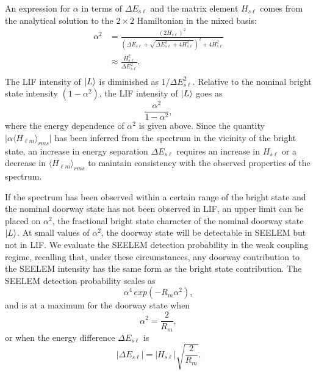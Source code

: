 An expression for $\alpha$ in terms of $\Delta E_{s\ell}$ and the matrix
element $H_{s\ell}$ comes from the analytical solution to the $2 \times
2$ Hamiltonian in the mixed basis:
\begin{equation}
  \begin{split}
    \alpha^2& = 
      \frac{\left ( 2 H_{s\ell} \right )^2}{
          \left (
            \Delta E_{s\ell} + 
            \sqrt{\Delta E_{s\ell}^2 + 4 H_{s\ell}^2}
          \right )^2
          + 4 H_{s\ell}^2
      }\\
      & \approx \frac{H_{s\ell}^2}{\Delta E_{s\ell}^2}.\\
      \end{split}
\end{equation}
The LIF intensity of $\mathinner{|{L}\rangle}$ is diminished as $1 / \Delta
E_{s\ell}^2$.  Relative to the nominal bright state intensity
$(1-\alpha^2)$, the LIF intensity of $\mathinner{|{L}\rangle}$ goes as
\begin{equation}
  \frac{\alpha^2}{1-\alpha^2},
\end{equation}
where the energy dependence of $\alpha^2$ is given above.  Since the
quantity $\lvert \alpha \langle H_{\ell m} \rangle_{rms} \rvert$ has
been inferred from the spectrum in the vicinity of the bright state,
an increase in energy separation $\Delta E_{s\ell}$ requires an
increase in $H_{s\ell}$ or a decrease in $\langle H_{\ell m}
\rangle_{rms}$ to maintain consistency with the observed properties of
the spectrum.

If the spectrum has been observed within a certain range of the bright
state and the nominal doorway state has not been observed in LIF, an
upper limit can be placed on $\alpha^2$, the fractional bright state
character of the nominal doorway state $\mathinner{|{L}\rangle}$. At small values
of $\alpha^2$, the doorway state will be detectable in SEELEM but not
in LIF.  We evaluate the SEELEM detection probability in the weak
coupling regime, recalling that, under these circumstances, any doorway
contribution to the SEELEM intensity has the same form as the bright
state contribution.  The SEELEM detection probability scales as
\begin{equation}
  \alpha^4 \, exp(-R_m \alpha^2),
\end{equation}
and is at a maximum for the doorway state when
\begin{equation}
  \alpha^2 = \frac{2}{R_m},
\end{equation}
or when the energy difference $\Delta E_{s\ell}$ is
\begin{equation}
  \lvert \Delta E_{s\ell} \rvert = 
  \lvert H_{s\ell} \rvert \sqrt{\frac{2}{R_m}}.
\end{equation}

